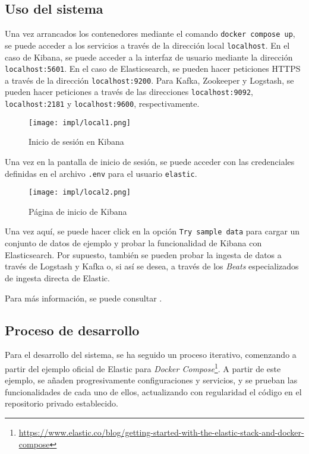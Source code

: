 \newpage{}
\subsection{Uso del sistema}
Una vez arrancados los contenedores mediante el comando
\texttt{docker compose up}, se puede acceder a los servicios a través de la
dirección local \texttt{localhost}. En el caso de Kibana, se puede acceder a
la interfaz de usuario mediante la dirección \texttt{localhost:5601}. En el
caso de Elasticsearch, se pueden hacer peticiones HTTPS a través de la dirección
\texttt{localhost:9200}. Para Kafka, Zookeeper y Logstash, se pueden hacer
peticiones a través de las direcciones \texttt{localhost:9092},
\texttt{localhost:2181} y \texttt{localhost:9600}, respectivamente.

\begin{figure}[H]
	\centering
	\texttt{[image: impl/local1.png]}
	\caption{Inicio de sesión en Kibana}
	\label{fig:kibana_login}
\end{figure}

Una vez en la pantalla de inicio de sesión, se puede acceder con las credenciales
definidas en el archivo \texttt{.env} para el usuario \texttt{elastic}.

\begin{figure}[H]
	\centering
	\texttt{[image: impl/local2.png]}
	\caption{Página de inicio de Kibana}
	\label{fig:kibana_start}
\end{figure}

Una vez aquí, se puede hacer click en la opción \texttt{Try sample data} para
cargar un conjunto de datos de ejemplo y probar la funcionalidad de Kibana con
Elasticsearch. Por supuesto, también se pueden probar la ingesta de datos a
través de Logstash y Kafka o, si así se desea, a través de los \textit{Beats}
especializados de ingesta directa de Elastic.

Para más información, se puede consultar .


\newpage{}
\subsection{Proceso de desarrollo}\label{subsec:impl_local_desarrollo}
Para el desarrollo del sistema, se ha seguido un proceso iterativo, comenzando
a partir del ejemplo oficial de Elastic para \textit{Docker Compose}\footnote{
  \url{https://www.elastic.co/blog/getting-started-with-the-elastic-stack-and-docker-compose}
}. A partir de este ejemplo, se añaden progresivamente configuraciones y
servicios, y se prueban las funcionalidades de cada uno de ellos, actualizando
con regularidad el código en el repositorio privado establecido.

